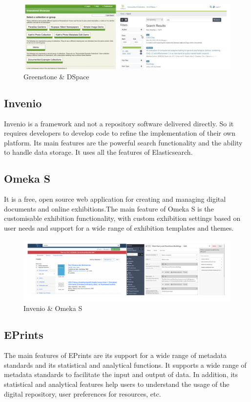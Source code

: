 \begin{figure}[htbp]
  \centerline{\includegraphics[width=500pt]{images/a1.jpg}}
  \caption{Greenstone \& DSpace}
\end{figure}

\subsection{Invenio}

Invenio is a framework and not a repository software delivered directly. So it requires developers to develop code to refine the implementation of their own platform. Its main features are the powerful search functionality and the ability to handle data storage\cite{Introduc17:online}. It uses all the features of Elasticsearch.



\subsection{Omeka S}
It is a free, open source web application for creating and managing digital documents and online exhibitions.The main feature of Omeka S is the customisable exhibition functionality, with custom exhibition settings based on user needs and support for a wide range of exhibition templates and themes\cite{FeatureL61:online}.

\begin{figure}[htbp]
  \centerline{\includegraphics[width=500pt]{images/a9.jpg}}
  \caption{Invenio \& Omeka S}
\end{figure}

\subsection{EPrints}
The main features of EPrints are its support for a wide range of metadata standards and its statistical and analytical functions. It supports a wide range of metadata standards to facilitate the input and output of data. In addition, its statistical and analytical features help users to understand the usage of the digital repository, user preferences for resources, etc\cite{EPrintsS41:online}.


